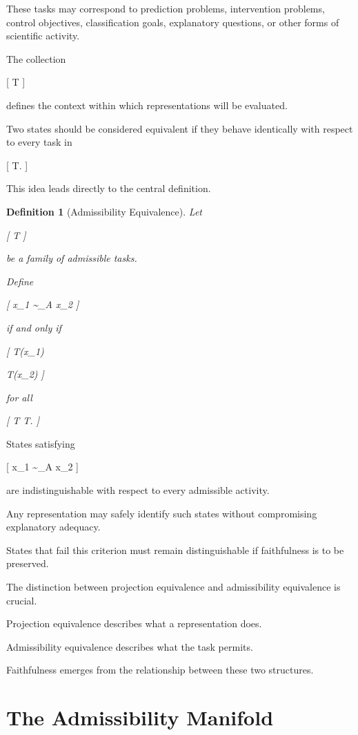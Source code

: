 \documentclass[11pt,oneside,openany]{book}
\newtheorem{definition}{Definition}[chapter] \newtheorem{theorem}{Theorem}[chapter] \newtheorem{proposition}{Proposition}[chapter] \newtheorem{lemma}{Lemma}[chapter] \newtheorem{corollary}{Corollary}[chapter] \newtheorem{remark}{Remark}[chapter]
\begin{document}
These tasks may correspond to prediction problems, intervention problems, control objectives, classification goals, explanatory questions, or other forms of scientific activity.

The collection

[
\mathcal T
]

defines the context within which representations will be evaluated.

Two states should be considered equivalent if they behave identically with respect to every task in

[
\mathcal T.
]

This idea leads directly to the central definition.

\begin{definition}[Admissibility Equivalence]

Let

[
\mathcal T
]

be a family of admissible tasks.

Define

[
x_1 \sim_A x_2
]

if and only if

[
T(x_1)

T(x_2)
]

for all

[
T \in \mathcal T.
]

\end{definition}

States satisfying

[
x_1 \sim_A x_2
]

are indistinguishable with respect to every admissible activity.

Any representation may safely identify such states without compromising explanatory adequacy.

States that fail this criterion must remain distinguishable if faithfulness is to be preserved.

The distinction between projection equivalence and admissibility equivalence is crucial.

Projection equivalence describes what a representation does.

Admissibility equivalence describes what the task permits.

Faithfulness emerges from the relationship between these two structures.

\section{The Admissibility Manifold}
\end{document}
